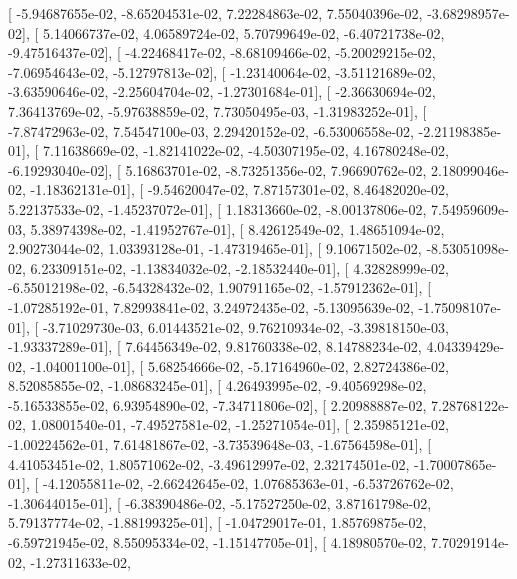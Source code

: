 \documentclass{article}
\begin{document}
       [ -5.94687655e-02,  -8.65204531e-02,   7.22284863e-02,
          7.55040396e-02,  -3.68298957e-02],
       [  5.14066737e-02,   4.06589724e-02,   5.70799649e-02,
         -6.40721738e-02,  -9.47516437e-02],
       [ -4.22468417e-02,  -8.68109466e-02,  -5.20029215e-02,
         -7.06954643e-02,  -5.12797813e-02],
       [ -1.23140064e-02,  -3.51121689e-02,  -3.63590646e-02,
         -2.25604704e-02,  -1.27301684e-01],
       [ -2.36630694e-02,   7.36413769e-02,  -5.97638859e-02,
          7.73050495e-03,  -1.31983252e-01],
       [ -7.87472963e-02,   7.54547100e-03,   2.29420152e-02,
         -6.53006558e-02,  -2.21198385e-01],
       [  7.11638669e-02,  -1.82141022e-02,  -4.50307195e-02,
          4.16780248e-02,  -6.19293040e-02],
       [  5.16863701e-02,  -8.73251356e-02,   7.96690762e-02,
          2.18099046e-02,  -1.18362131e-01],
       [ -9.54620047e-02,   7.87157301e-02,   8.46482020e-02,
          5.22137533e-02,  -1.45237072e-01],
       [  1.18313660e-02,  -8.00137806e-02,   7.54959609e-03,
          5.38974398e-02,  -1.41952767e-01],
       [  8.42612549e-02,   1.48651094e-02,   2.90273044e-02,
          1.03393128e-01,  -1.47319465e-01],
       [  9.10671502e-02,  -8.53051098e-02,   6.23309151e-02,
         -1.13834032e-02,  -2.18532440e-01],
       [  4.32828999e-02,  -6.55012198e-02,  -6.54328432e-02,
          1.90791165e-02,  -1.57912362e-01],
       [ -1.07285192e-01,   7.82993841e-02,   3.24972435e-02,
         -5.13095639e-02,  -1.75098107e-01],
       [ -3.71029730e-03,   6.01443521e-02,   9.76210934e-02,
         -3.39818150e-03,  -1.93337289e-01],
       [  7.64456349e-02,   9.81760338e-02,   8.14788234e-02,
          4.04339429e-02,  -1.04001100e-01],
       [  5.68254666e-02,  -5.17164960e-02,   2.82724386e-02,
          8.52085855e-02,  -1.08683245e-01],
       [  4.26493995e-02,  -9.40569298e-02,  -5.16533855e-02,
          6.93954890e-02,  -7.34711806e-02],
       [  2.20988887e-02,   7.28768122e-02,   1.08001540e-01,
         -7.49527581e-02,  -1.25271054e-01],
       [  2.35985121e-02,  -1.00224562e-01,   7.61481867e-02,
         -3.73539648e-03,  -1.67564598e-01],
       [  4.41053451e-02,   1.80571062e-02,  -3.49612997e-02,
          2.32174501e-02,  -1.70007865e-01],
       [ -4.12055811e-02,  -2.66242645e-02,   1.07685363e-01,
         -6.53726762e-02,  -1.30644015e-01],
       [ -6.38390486e-02,  -5.17527250e-02,   3.87161798e-02,
          5.79137774e-02,  -1.88199325e-01],
       [ -1.04729017e-01,   1.85769875e-02,  -6.59721945e-02,
          8.55095334e-02,  -1.15147705e-01],
       [  4.18980570e-02,   7.70291914e-02,  -1.27311633e-02,
\end{document}
